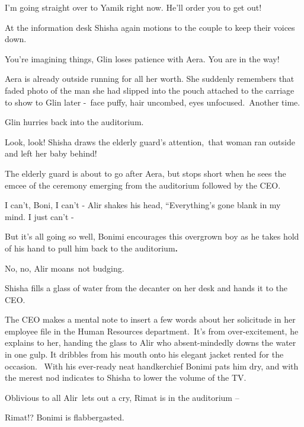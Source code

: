 \documentclass[letterpaper]{article}
\begin{document}
{\textquotedbl}I'm going straight over to Yamik right now. He'll order you to get out!{\textquotedbl} 

At the information desk Shisha again motions to the couple to keep their voices down.

{\textquotedbl}You're imagining things,{\textquotedbl} Glin loses patience with Aera. {\textquotedbl}You are in the
way!{\textquotedbl}

Aera is already outside running for all her worth. She suddenly remembers that faded photo of the man she had slipped
into the pouch attached to the carriage to show to Glin later -\ face puffy, hair uncombed, eyes unfocused.\ Another
time.

Glin hurries back into the auditorium. 

{\textquotedbl}Look, look!{\textquotedbl} Shisha draws the elderly guard's attention,\ {\textquotedbl}that woman ran
outside and left her baby behind!{\textquotedbl} 

The elderly guard is about to go after Aera, but stops short when he sees the emcee of the ceremony emerging from the
auditorium followed by the CEO.

{\textquotedbl}I can't, Boni, I can't -{\textquotedbl} Alir shakes his head, ``Everything's gone blank in my mind. I
just can't -{\textquotedbl}~ 

{\textquotedbl}But it's all going so well,{\textquotedbl} Bonimi encourages this overgrown boy as he takes hold of his
hand to pull him back to the auditorium\textbf{. }

{\textquotedbl}No, no,{\textquotedbl} Alir moans~not budging.

Shisha fills a glass of water from the decanter on her desk and hands it to the CEO.

The CEO makes a mental note to insert a few words about her solicitude in her employee file in the Human Resources
department.\  {\textquotedbl}It's from over-excitement,{\textquotedbl} he explains to her, handing the glass to Alir
who absent-mindedly downs the water in one gulp. It dribbles from his mouth onto his elegant jacket rented for the
occasion. \ With his ever-ready neat handkerchief Bonimi pats him dry, and with the merest nod indicates to Shisha to
lower the volume of the TV.

Oblivious to all Alir~lets out a cry, {\textquotedbl}Rimat is in the auditorium --{\textquotedbl} 

{\textquotedbl}Rimat!?{\textquotedbl} Bonimi is flabbergasted. \ 
\end{document}
